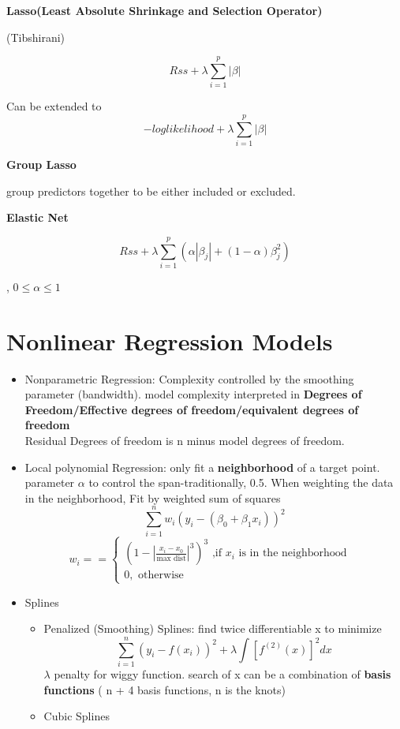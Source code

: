 \documentclass[11pt, openany]{book}              %
\begin{document}
\textbf{Lasso(Least Absolute Shrinkage and Selection Operator)}

(Tibshirani)

$$Rss + \lambda \sum_{i=1}^p |\beta|$$

Can be extended to 
$$-log likelihood + \lambda \sum_{i=1}^p |\beta|$$

\textbf{Group Lasso}

group predictors together to be either included or excluded. 

\textbf{Elastic Net}

$$Rss + \lambda \sum_{i=1}^p (\alpha|\beta_j| + (1-\alpha) \beta_j^2)$$

, $ 0\leq \alpha \leq 1$

\section{Nonlinear Regression Models}

\begin{itemize}
	\item Nonparametric Regression: Complexity controlled by the smoothing parameter (bandwidth). model complexity interpreted in \textbf{Degrees of Freedom/Effective degrees of freedom/equivalent degrees of freedom} \\Residual Degrees of freedom is n minus model degrees of freedom.
	\item Local polynomial Regression: only fit a \textbf{neighborhood} of a target point. parameter $\alpha$ to control the span-traditionally, 0.5. When weighting the data in the neighborhood,
      Fit by weighted sum of squares
	  $$\sum_{i=1}^n w_i (y_i  - (\beta_0 + \beta_1 x_i))^2$$
	    $$w_i = = \left\{
             \begin{array}{lr}
             (1-|\frac{x_i-x_0}{\text{max dist}}|^3)^3 \text{ ,if $x_i$ is in the neighborhood} &  \\
             0, \text{ otherwise } &  
             \end{array}
      \right.$$
	  \item Splines
	  \begin{itemize}
	  	\item Penalized (Smoothing) Splines: find twice differentiable x to minimize 
		$$\sum_{i=1}^n (y_i - f(x_i))^2 + \lambda \int [ f^{(2)}(x)]^2 dx $$
		$\lambda$ penalty for wiggy function. search of x can be a combination of \textbf{basis functions} ( n + 4 basis functions, n is the knots)
	  	\item Cubic Splines
	  \end{itemize}
\end{itemize}	  
\end{document}
